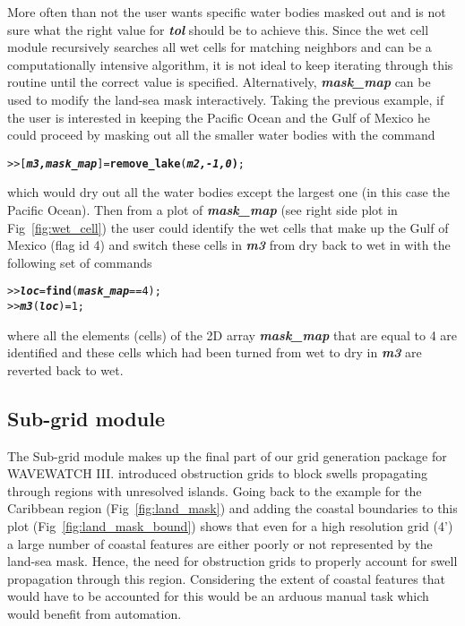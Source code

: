 \documentclass[12pt]{article}
\begin{document}
More often than not the user wants specific water bodies masked out and is not sure what the right value for \textbf{\textit{tol}} should be to achieve this. Since the wet cell module recursively searches all wet cells for matching neighbors and can be a computationally intensive algorithm, it is not ideal to keep iterating through this routine until the correct value is specified. Alternatively, \textbf{\textit{mask\_map}} can be used to modify the land-sea mask interactively. Taking the previous example, if the user is interested in keeping the Pacific Ocean and the Gulf of Mexico he could proceed by masking out all the smaller water bodies with the command
\begin{alltt}
>> [\textbf{\textit{m3,mask\_map}}] = \textbf{remove\_lake}(\textbf{\textit{m2,-1,0})};
\end{alltt}
 which would dry out all the water bodies except the largest one (in this case the Pacific Ocean). Then from a plot of \textbf{\textit{mask\_map}} (see right side plot in Fig~\ref{fig:wet_cell}) the user could identify the wet cells that make up the Gulf of Mexico (flag id 4) and switch these cells in \textbf{\textit{m3}} from dry back to wet in with the following set of commands
\begin{alltt} 
>> \textbf{\textit{loc}} = \textbf{find}(\textbf{\textit{mask\_map}} == 4);
>> \textbf{\textit{m3}}(\textbf{\textit{loc}}) = 1;
\end{alltt}
where all the elements (cells) of the 2D array \textbf{\textit{mask\_map}} that are equal to 4 are identified and these cells which had been turned from wet to dry in \textbf{\textit{m3}} are reverted back to wet.

\subsection{Sub-grid module}
\label{sc:sub_grid}

The Sub-grid module makes up the final part of our grid generation package for WAVEWATCH III. \cite{tol2003} introduced obstruction grids to block swells propagating through regions with unresolved islands. Going back to the example for the Caribbean region (Fig~\ref{fig:land_mask}) and adding the coastal boundaries to this plot (Fig~\ref{fig:land_mask_bound}) shows that even for a high resolution grid (4') a large number of coastal features are either poorly or not represented by the land-sea mask. Hence, the need for obstruction grids to properly account for swell propagation through this region. Considering the extent of coastal features that would have to be accounted for this would be an arduous manual task which would benefit from automation.
\end{document}
